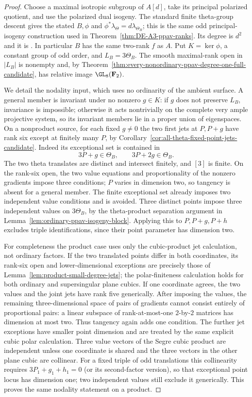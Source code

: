 \begin{proof}
Choose a maximal isotropic subgroup of $A[d]$, take its principal
polarized quotient, and use the polarized dual isogeny. The standard
finite theta-group descent gives the stated $B,\phi$ and
$\phi^*\lambda_\Theta=d\lambda_{\Theta_B}$; this is the same
odd principal-isogeny construction used in
Theorem~\ref{thm:DE-A3-ppav-ranks}. Its degree is $d^2$ and it is
\etale. In particular $B$ has the same two-rank $f$ as $A$.
Put $K=\ker\phi$, a constant group of odd order, and $L_B=3\Theta_B$.
The smooth maximal-rank open in $|L_B|$ is nonempty and, by
Theorem~\ref{thm:every-nonordinary-ppav-degree-one-full-candidate},
has relative image $\GL_8(\mathbf F_2)$.

We detail the nodality input, which uses no ordinarity of the ambient
surface. A general member is invariant under no nonzero $g\in K$:
if $g$ does not preserve $L_B$, invariance is impossible; otherwise
it acts nontrivially on the complete very ample projective system,
so its invariant members lie in a proper union of eigenspaces.
On a nonproduct source, for each fixed $g\ne0$ the two first jets
at $P,P+g$ have rank six except at finitely many $P$, by
Corollary~\ref{cor:all-theta-fixed-point-jets-candidate}.
Indeed its exceptional set is contained in
\[
                     3P+g\in\Theta_B,\qquad
                     3P+2g\in\Theta_B.
\]
The two theta translates are distinct and intersect finitely, and
$[3]$ is finite. On the rank-six open, the two value equations and
proportionality of the nonzero gradients impose three conditions;
$P$ varies in dimension two, so tangency is absent for a general
member. The finite exceptional set already imposes two independent
value conditions and is avoided. Three distinct points impose three
independent values on $3\Theta_B$, by the theta-product separation
argument in Lemma~\ref{lem:ordinary-ppav-isogeny-block}. Applying this
to $P,P+g,P+h$ excludes triple identifications, since their point
parameter has dimension two.

For completeness the product case uses only the cubic-product jet
calculation, not ordinary factors. If the two translated points differ
in both coordinates, its rank-six open and lower-dimensional exceptions
are precisely those of Lemma~\ref{lem:product-small-degree-jets};
the polar-finiteness calculation holds for both ordinary and
supersingular plane cubics. If one coordinate agrees, the two values
and the joint jets have rank five generically. After imposing the
values, the remaining three-dimensional space of pairs of gradients
cannot consist entirely of proportional pairs: a linear subspace of
rank-at-most-one $2$-by-$2$ matrices has dimension at most two.
Thus tangency again adds one condition. The further jet exceptions
have smaller point dimension and are treated by the same explicit
cubic polar calculation. Three value vectors of the Segre cubic
product are independent unless one coordinate is shared and the
three vectors in the other plane cubic are collinear. For a fixed
triple of odd translations this collinearity requires
$3P_1+g_1+h_1=0$ (or its second-factor version), so that exceptional
point locus has dimension one; two independent values still exclude
it generically. This proves the same nodality statement on a product.


\end{proof}
